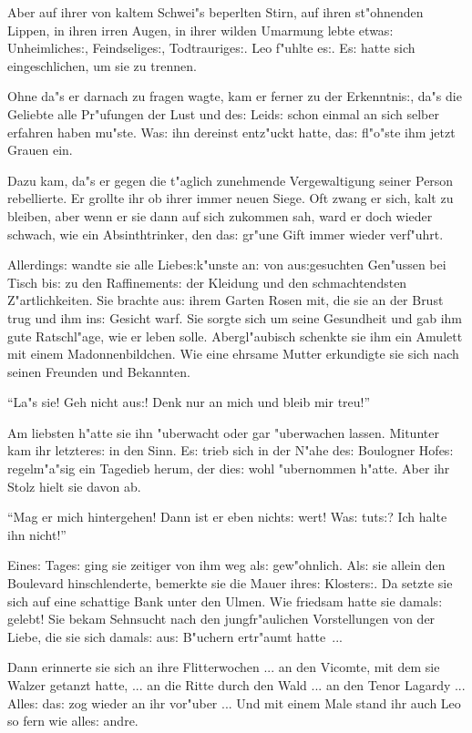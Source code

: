 \documentclass[oneside,12pt]{book}
\newcommand{\s}{s:}%
\begin{document}
Aber auf ihrer von kaltem Schwei"s beperlten Stirn, auf ihren
st"ohnenden Lippen, in ihren irren Augen, in ihrer wilden Umarmung
lebte etwa{\s} Unheimliche{\s}, Feindselige{\s}, Todtraurige{\s}.
Leo f"uhlte e{\s}. E{\s} hatte sich eingeschlichen, um sie zu
trennen.

Ohne da"s er darnach zu fragen wagte, kam er ferner zu der
Erkenntni{\s}, da"s die Geliebte alle Pr"ufungen der Lust und
de{\s} Leid{\s} schon einmal an sich selber erfahren haben mu"ste.
Wa{\s} ihn dereinst ent\/z"uckt hatte, da{\s} fl"o"ste ihm jetzt
Grauen ein.

Dazu kam, da"s er gegen die t"aglich zunehmende Vergewaltigung
seiner Person rebellierte. Er grollte ihr ob ihrer immer neuen
Siege. Oft zwang er sich, kalt zu bleiben, aber wenn er sie dann
auf sich zukommen sah, ward er doch wieder schwach, wie ein
Absinthtrinker, den da{\s} gr"une Gift immer wieder verf"uhrt.

Allerding{\s} wandte sie alle Liebe{\s}k"unste an: von
au{\s}gesuchten Gen"ussen bei Tisch bi{\s} zu den Raffinement{\s}
der Kleidung und den schmachtendsten Z"artlichkeiten. Sie brachte
au{\s} ihrem Garten Rosen mit, die sie an der Brust trug und ihm
in{\s} Gesicht warf. Sie sorgte sich um seine Gesundheit und gab
ihm gute Ratschl"age, wie er leben solle. Abergl"aubisch schenkte
sie ihm ein Amulett mit einem Madonnenbildchen. Wie eine ehrsame
Mutter erkundigte sie sich nach seinen Freunden und Bekannten.

"`La"s sie! Geh nicht au{\s}! Denk nur an mich und bleib mir treu!"'

Am liebsten h"atte sie ihn "uberwacht oder gar "uberwachen lassen.
Mitunter kam ihr letztere{\s} in den Sinn. E{\s} trieb sich in der
N"ahe de{\s} Boulogner Hofe{\s} regelm"a"sig ein Tagedieb herum,
der die{\s} wohl "ubernommen h"atte. Aber ihr Stolz hielt sie
davon ab.

"`Mag er mich hintergehen! Dann ist er eben nicht{\s} wert! Wa{\s}
tut{\s}? Ich halte ihn nicht!"'

Eine{\s} Tage{\s} ging sie zeitiger von ihm weg al{\s}
gew"ohnlich. Al{\s} sie allein den Boulevard hinschlenderte,
bemerkte sie die Mauer ihre{\s} Kloster{\s}. Da setzte sie sich
auf eine schattige Bank unter den Ulmen. Wie friedsam hatte sie
damal{\s} gelebt! Sie bekam Sehnsucht nach den jungfr"aulichen
Vorstellungen von der Liebe, die sie sich damal{\s} au{\s}
B"uchern ertr"aumt hatte~...

Dann erinnerte sie sich an ihre Flitterwochen ... an den Vicomte,
mit dem sie Walzer getanzt hatte, ... an die Ritte durch den Wald
... an den Tenor Lagardy ... Alle{\s} da{\s} zog wieder an ihr
vor"uber ... Und mit einem Male stand ihr auch Leo so fern wie
alle{\s} andre.
\end{document}
